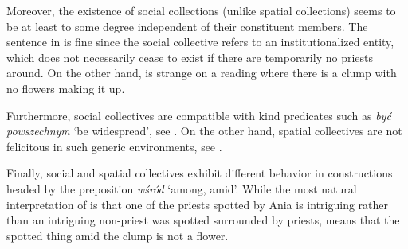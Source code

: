 \documentclass[output=paper]{langscibook}
\begin{document}
\noindent Moreover, the existence of social collections (unlike spatial collections) seems to be at least to some degree independent of their constituent members. The sentence in  is fine since the social collective refers to an institutionalized entity, which does not necessarily cease to exist if there are temporarily no priests around. On the other hand,  is strange on a reading where there is a clump with no flowers making it up. 

\ea\label{wan:ex:no}
\label{wan:ex:social-no}
\label{wan:ex:spatial-no}
\z
\z

\noindent Furthermore, social collectives are compatible with kind predicates such as \textit{być powszechnym} `be widespread', see . On the other hand, spatial collectives are not felicitous in such generic environments, see .

\ea\label{wan:ex:generic}
\label{wan:ex:generic-social}
\label{wan:ex:generic-spatial}
\z
\z

\noindent Finally, social and spatial collectives exhibit different behavior in constructions headed by the preposition \textit{wśród} `among, amid'. While the most natural interpretation of  is that one of the priests spotted by Ania is intriguing rather than an intriguing non-priest was spotted surrounded by priests,  means that the spotted thing amid the clump is not a flower.
\end{document}
